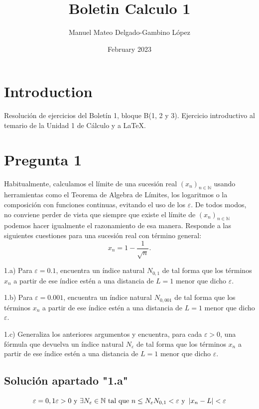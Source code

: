 \documentclass{article}
\title{Boletin Calculo 1}
\author{Manuel Mateo Delgado-Gambino López}
\date{February 2023}
\begin{document}
\maketitle

\section{Introduction}
Resolución de ejercicios del Boletín 1, bloque B(1, 2 y 3).
Ejercicio introductivo al temario de la Unidad 1 de Cálculo y a LaTeX.

\section{Pregunta 1}

\setlength{\parindent}{0cm}

Habitualmente, calculamos el límite de una sucesión real $(x_{n})_{n \in \mathbb{N}}$ usando herramientas como el Teorema de Algebra de Límites, los logaritmos o la composición con funciones continuas, evitando el uso de los $\varepsilon$. De todos modos, no conviene perder de vista que siempre que existe el límite de $(x_{n})_{n \in \mathbb{N}}$ podemos hacer igualmente el razonamiento de esa manera. Responde a las siguientes cuestiones para una sucesión real con término general:
$$x_{n} = 1 - \frac{1}{\sqrt{n}}.$$
    
    \setlength{\parindent}{1cm}
        1.a) Para $\varepsilon = 0.1$, encuentra un índice natural $N_{0,1}$ de tal forma que los términos $x_n$ a partir de ese índice estén a una distancia de $L=1$ menor que dicho $\varepsilon$.

        1.b) Para $\varepsilon = 0.001$, encuentra un índice natural $N_{0,001}$ de tal forma que los términos $x_n$ a partir de ese índice estén a una distancia de $L=1$ menor que dicho $\varepsilon$.

        1.c) Generaliza los anteriores argumentos y encuentra, para cada $\varepsilon > 0$, una fórmula que devuelva un índice natural $N_{\varepsilon}$ de tal forma que los términos $x_n$ a partir de ese índice estén a una distancia de $L=1$ menor que dicho $\varepsilon$.
    

    \subsection{Solución apartado "1.a"}
\begin{equation}
\varepsilon = 0,1 \\
\varepsilon > 0 \text{ y } \exists N_{\varepsilon} \in \mathbb{N} \text{ tal que } n \leq N_{\varepsilon} \\
N_{0,1} < \varepsilon \text{ y } \left| x_{n} - L \right| < \varepsilon
\end{equation}
\end{document}
